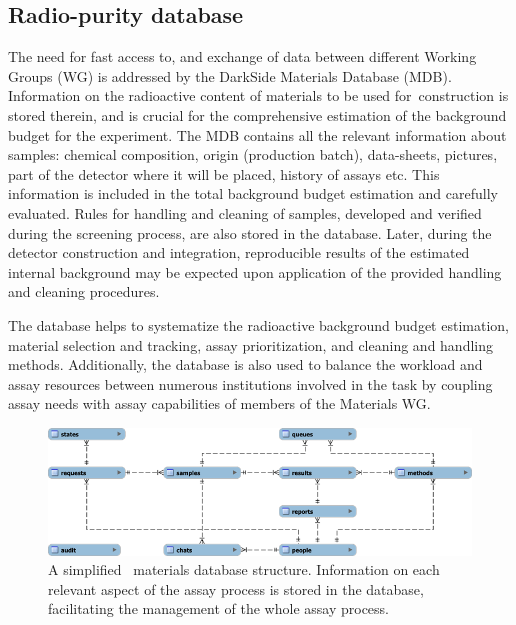 \subsection{Radio-purity database}
\label{sec:Mat-DB}

The need for fast access to, and exchange of data between different Working Groups (WG) is addressed by the DarkSide Materials Database (MDB). Information on the radioactive content of materials to be used for \DSks\,construction is stored therein, and is crucial for the comprehensive estimation of the background budget for the experiment. The MDB contains all the relevant information about samples: chemical composition, origin (production batch), data-sheets, pictures, part of the detector where it will be placed, history of assays etc. This information is included in the total background budget estimation and carefully evaluated. Rules for handling and cleaning of samples, developed and verified during the screening process, are also stored in the database. Later, during the detector construction and integration, reproducible results of the estimated internal background may be expected upon application of the provided handling and cleaning procedures.

The database helps to systematize the radioactive background budget estimation, material selection and tracking, assay prioritization, and cleaning and handling methods. Additionally, the database is also used to balance the workload and assay resources between numerous institutions involved in the task by coupling assay needs with assay capabilities of members of the Materials WG.

\begin{figure}[!t]
\center\includegraphics[width=\textwidth]{./Figures/mdb_structure.png}
\caption[\DSks\ materials database structure]{A simplified \DSks\ materials database structure. Information on each relevant aspect of the assay process is stored in the database, facilitating the management of the whole assay process.}
\label{fig:mdb_structure}
\end{figure} 

